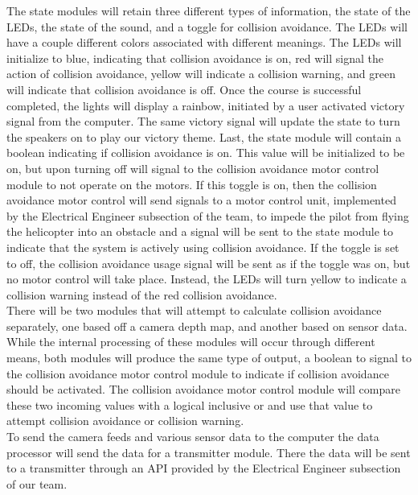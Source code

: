 \documentclass[onecolumn, oneside, letterpaper, draftclsnofoot, 10pt, compsoc]{IEEEtran}
\begin{document}
The state modules will retain three different types of information, the state of the LEDs, the state of the sound, and a toggle for collision avoidance. The LEDs will have a couple different colors associated with different meanings. The LEDs will initialize to blue, indicating that collision avoidance is on, red will signal the action of collision avoidance, yellow will indicate a collision warning, and green will indicate that collision avoidance is off. Once the course is successful completed, the lights will display a rainbow, initiated by a user activated victory signal from the computer. The same victory signal will update the state to turn the speakers on to play our victory theme. Last, the state module will contain a boolean indicating if collision avoidance is on. This value will be initialized to be on, but upon turning off will signal to the collision avoidance motor control module to not operate on the motors. If this toggle is on, then the collision avoidance motor control will send signals to a motor control unit, implemented by the Electrical Engineer subsection of the team, to impede the pilot from flying the helicopter into an obstacle and a signal will be sent to the state module to indicate that the system is actively using collision avoidance. If the toggle is set to off, the collision avoidance usage signal will be sent as if the toggle was on, but no motor control will take place. Instead, the LEDs will turn yellow to indicate a collision warning instead of the red collision avoidance. \\

There will be two modules that will attempt to calculate collision avoidance separately, one based off a camera depth map, and another based on sensor data. While the internal processing of these modules will occur through different means, both modules will produce the same type of output, a boolean to signal to the collision avoidance motor control module to indicate if collision avoidance should be activated. The collision avoidance motor control module will compare these two incoming values with a logical inclusive or and use that value to attempt collision avoidance or collision warning. \\

To send the camera feeds and various sensor data to the computer the data processor will send the data for a transmitter module. There the data will be sent to a transmitter through an API provided by the Electrical Engineer subsection of our team.
\end{document}
